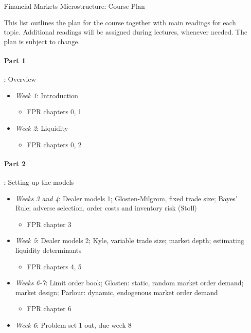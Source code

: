 \documentclass{article}
\begin{document}
\begin{center}
	{\huge Financial Markets Microstructure: Course Plan}
\end{center}
\bigskip

This list outlines the plan for the course together with main readings for each topic. Additional readings will be assigned during lectures, whenever needed. The plan is subject to change.
\medskip

\paragraph{Part 1}: Overview
\begin{itemize}
	\item \textit{Week 1}: Introduction
	\begin{itemize}
		\item FPR chapters 0, 1
	\end{itemize}
	\item \textit{Week 2}: Liquidity
	\begin{itemize}
		\item FPR chapters 0, 2
	\end{itemize}
\end{itemize}

\medskip 
\paragraph{Part 2}: Setting up the models
\begin{itemize}
	\item \textit{Weeks 3 and 4}: Dealer models 1; {Glosten-Milgrom}, fixed trade size; Bayes' Rule; adverse selection, order costs and inventory risk ({Stoll})
	\begin{itemize}
		\item FPR chapter 3
	\end{itemize}
	\item \textit{Week 5}: Dealer models 2; {Kyle}, variable trade size; market depth; estimating liquidity determinants
	\begin{itemize}
		\item FPR chapters 4, 5
	\end{itemize}
	\item \textit{Weeks 6-7}: Limit order book; {Glosten}: static, random market order demand; market design; {Parlour}: dynamic, endogenous market order demand
	\begin{itemize}
		\item FPR chapter 6
	\end{itemize}
	\item \textit{Week 6}: Problem set 1 out, due week 8
\end{itemize}
\end{document}
